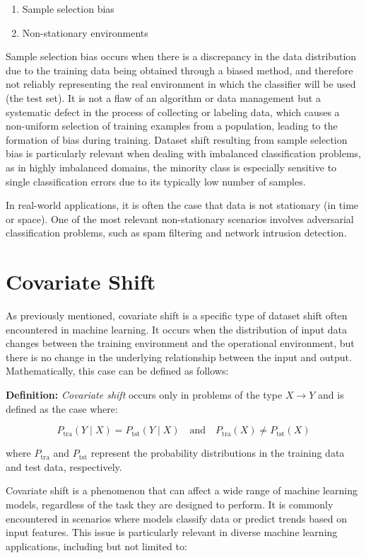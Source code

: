 \begin{enumerate}
	\item Sample selection bias
	\item Non-stationary environments
\end{enumerate}

Sample selection bias occurs when there is a discrepancy in the data distribution due to the training data being obtained through a biased method, and therefore not reliably representing the real environment in which the classifier will be used (the test set). It is not a flaw of an algorithm or data management but a systematic defect in the process of collecting or labeling data, which causes a non-uniform selection of training examples from a population, leading to the formation of bias during training. Dataset shift resulting from sample selection bias is particularly relevant when dealing with imbalanced classification problems, as in highly imbalanced domains, the minority class is especially sensitive to single classification errors due to its typically low number of samples. 

In real-world applications, it is often the case that data is not stationary (in time or space). One of the most relevant non-stationary scenarios involves adversarial classification problems, such as spam filtering and network intrusion detection.
	

\section{Covariate Shift}

As previously mentioned, covariate shift is a specific type of dataset shift often encountered in machine learning. It occurs when the distribution of input data changes between the training environment and the operational environment, but there is no change in the underlying relationship between the input and output. Mathematically, this case can be defined as follows:  
	
\textbf{Definition:} \textit{Covariate shift} occurs only in problems of the type $X \to Y$ and is defined as the case where:  

$$
P_{\text{tra}}(Y \mid X) = P_{\text{tst}}(Y \mid X) \quad \text{and} \quad P_{\text{tra}}(X) \neq P_{\text{tst}}(X)
$$

where $P_{\text{tra}}$ and $P_{\text{tst}}$ represent the probability distributions in the training data and test data, respectively.  

Covariate shift is a phenomenon that can affect a wide range of machine learning models, regardless of the task they are designed to perform. It is commonly encountered in scenarios where models classify data or predict trends based on input features. This issue is particularly relevant in diverse machine learning applications, including but not limited to:
	
